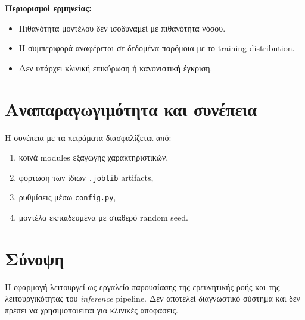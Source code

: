 \textbf{Περιορισμοί ερμηνείας:}
\begin{itemize}
    \item Πιθανότητα μοντέλου δεν ισοδυναμεί με πιθανότητα νόσου.
    \item Η συμπεριφορά αναφέρεται σε δεδομένα παρόμοια με το training distribution.
    \item Δεν υπάρχει κλινική επικύρωση ή κανονιστική έγκριση.
\end{itemize}

\section{Αναπαραγωγιμότητα και συνέπεια}

Η συνέπεια με τα πειράματα διασφαλίζεται από:
\begin{enumerate}
    \item κοινά modules εξαγωγής χαρακτηριστικών,
    \item φόρτωση των ίδιων \texttt{.joblib} artifacts,
    \item ρυθμίσεις μέσω \texttt{config.py},
    \item μοντέλα εκπαιδευμένα με σταθερό random seed.
\end{enumerate}

\section{Σύνοψη}

Η εφαρμογή λειτουργεί ως εργαλείο παρουσίασης της ερευνητικής ροής και της λειτουργικότητας του \textit{inference} pipeline. Δεν αποτελεί διαγνωστικό σύστημα και δεν πρέπει να χρησιμοποιείται για κλινικές αποφάσεις.
